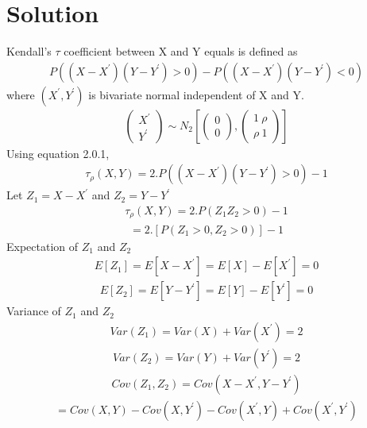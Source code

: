 \documentclass[journal,12pt,twocolumn]{IEEEtran}
\begin{document}
\section{Solution}
Kendall's $\tau$ coefficient between X and Y equals is defined as 
\begin{align}
    P((X-X^\prime)(Y-Y^\prime)>0)-P((X-X^\prime)(Y-Y^\prime)<0)
\end{align}
where $(X^\prime, Y^\prime)$ is bivariate normal independent of X and Y.
\begin{align}
    \begin{pmatrix}X^\prime\\Y^\prime\end{pmatrix} \sim N_{2} \left[\begin{pmatrix}0\\0\end{pmatrix},\begin{pmatrix}1\ \rho\\ \rho\ 1\end{pmatrix} \right]
\end{align}
Using equation 2.0.1,
\begin{align}
    \tau_{\rho}(X,Y)= 2.P((X-X^\prime)(Y-Y^\prime)>0)-1
\end{align}
Let $Z_{1}= X-X^\prime$ and $Z_{2}= Y-Y^\prime$
\begin{align}
    \tau_{\rho}(X,Y)= 2.P(Z_{1}Z_{2}>0)-1
\end{align}
\begin{align}
    = 2.[P(Z_{1}>0,Z_{2}>0)]-1
\end{align}
Expectation of $Z_{1}$ and $Z_{2}$
\begin{align}
   E[Z_{1}] = E[X-X^\prime] = E[X]-E[X^\prime] = 0
\end{align}
\begin{align}
   E[Z_{2}] = E[Y-Y^\prime] = E[Y]-E[Y^\prime] = 0
\end{align}
Variance of $Z_{1}$ and $Z_{2}$
\begin{align}
   Var(Z_{1}) = Var(X)+Var(X^\prime) = 2
\end{align}
\begin{align}
   Var(Z_{2}) = Var(Y)+Var(Y^\prime) = 2
\end{align}
\begin{align}
   Cov(Z_{1},Z_{2}) = Cov (X-X^\prime,Y-Y^\prime)
\end{align}
\begin{align}
  = Cov(X,Y)-Cov(X,Y^\prime)-Cov(X^\prime,Y)+Cov(X^\prime,Y^\prime)
\end{align}
\end{document}

